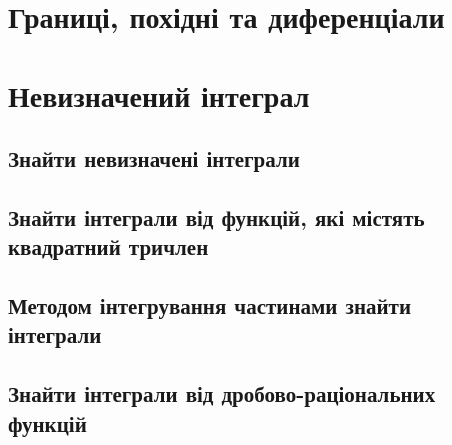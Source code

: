 \documentclass[a4paper, 12pt, oneside]{extreport}
\begin{document}


\chapter{Границі, похідні та диференціали}





\setcounter{subsection}{9}
% 


\setcounter{subsection}{13}
% 






\chapter{Невизначений інтеграл}

\section*{Знайти невизначені інтеграли}







\section*{Знайти інтеграли від функцій, які містять квадратний тричлен}





\section*{Методом інтегрування частинами знайти інтеграли}


\setcounter{subsection}{13}

\section*{Знайти інтеграли від дробово-раціональних функцій}
\end{document}
